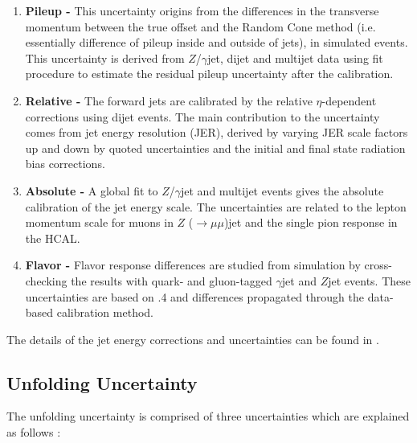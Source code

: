 \begin{enumerate}
\item {\bf Pileup -} This uncertainty origins from the differences in the transverse momentum between the true offset and the Random Cone method (i.e. essentially difference of pileup inside and outside of jets), in simulated events. This uncertainty is derived from $Z$/$\gamma$\plusn jet, dijet and multijet data using fit procedure to estimate the residual pileup uncertainty after the calibration. 

\item {\bf Relative -} The forward jets are calibrated by the relative $\eta$-dependent corrections using dijet events. The main contribution to the uncertainty comes from jet energy resolution (JER), derived by varying JER scale factors up and down by quoted uncertainties and the initial and final state radiation bias corrections.

\item {\bf Absolute -} A global fit to $Z$/$\gamma$\plusn jet and multijet events gives the absolute calibration of the jet energy scale. The uncertainties are related to the lepton momentum scale for muons in $Z$ ($\rightarrow\mu\mu$)\plusn jet and the single pion response in the HCAL. 

\item {\bf Flavor -} Flavor response differences are studied from simulation by cross-checking the results with quark- and gluon-tagged $\gamma$\plusn jet and $Z$\plusn jet events. These uncertainties are based on \PYTHIASn.4 and  differences propagated through the data-based calibration method.
\end{enumerate}
The details of the jet energy corrections and uncertainties can be found in \cite{JEC}. 

\subsection{Unfolding Uncertainty}
\label{sec:unfolding_unc}

The unfolding uncertainty is comprised of three uncertainties which are explained as follows :

